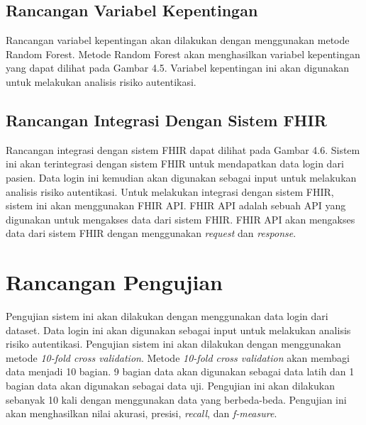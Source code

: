 \subsection{Rancangan Variabel Kepentingan}
Rancangan variabel kepentingan akan dilakukan dengan menggunakan metode Random Forest. Metode Random Forest akan menghasilkan variabel kepentingan yang dapat dilihat pada Gambar 4.5. Variabel kepentingan ini akan digunakan untuk melakukan analisis risiko autentikasi.

\subsection{Rancangan Integrasi Dengan Sistem FHIR}
Rancangan integrasi dengan sistem FHIR dapat dilihat pada Gambar 4.6. Sistem ini akan terintegrasi dengan sistem FHIR untuk mendapatkan data login dari pasien. Data login ini kemudian akan digunakan sebagai input untuk melakukan analisis risiko autentikasi.
Untuk melakukan integrasi dengan sistem FHIR, sistem ini akan menggunakan FHIR API. FHIR API adalah sebuah API yang digunakan untuk mengakses data dari sistem FHIR. FHIR API akan mengakses data dari sistem FHIR dengan menggunakan \textit{request} dan \textit{response}.

\section{Rancangan Pengujian}
Pengujian sistem ini akan dilakukan dengan menggunakan data login dari dataset. Data login ini akan digunakan sebagai input untuk melakukan analisis risiko autentikasi. Pengujian sistem ini akan dilakukan dengan menggunakan metode \textit{10-fold cross validation}. Metode \textit{10-fold cross validation} akan membagi data menjadi 10 bagian. 9 bagian data akan digunakan sebagai data latih dan 1 bagian data akan digunakan sebagai data uji. Pengujian ini akan dilakukan sebanyak 10 kali dengan menggunakan data yang berbeda-beda. Pengujian ini akan menghasilkan nilai akurasi, presisi, \textit{recall}, dan \textit{f-measure}.